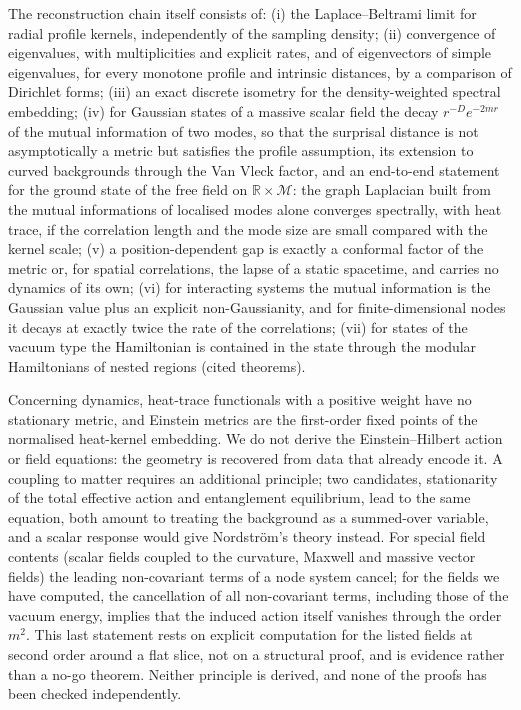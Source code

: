 \documentclass[11pt,a4paper]{article}
\theoremstyle{stmt}
\theoremstyle{defn}
\theoremstyle{rmk}
\numberwithin{equation}{section}
\newcommand{\M}{\mathcal{M}}
\newcommand{\R}{\mathbb{R}}
\begin{document}
{\smallskip\noindent The reconstruction chain itself consists of: (i) the Laplace--Beltrami limit for radial profile kernels, independently of the sampling density; (ii) convergence of eigenvalues, with multiplicities and explicit rates, and of eigenvectors of simple eigenvalues, for every monotone profile and intrinsic distances, by a comparison of Dirichlet forms; (iii) an exact discrete isometry for the density-weighted spectral embedding; (iv) for Gaussian states of a massive scalar field the decay $r^{-D}e^{-2mr}$ of the mutual information of two modes, so that the surprisal distance is not asymptotically a metric but satisfies the profile assumption, its extension to curved backgrounds through the Van Vleck factor, and an end-to-end statement for the ground state of the free field on $\R\times\M$: the graph Laplacian built from the mutual informations of localised modes alone converges spectrally, with heat trace, if the correlation length and the mode size are small compared with the kernel scale; (v) a position-dependent gap is exactly a conformal factor of the metric or, for spatial correlations, the lapse of a static spacetime, and carries no dynamics of its own; (vi) for interacting systems the mutual information is the Gaussian value plus an explicit non-Gaussianity, and for finite-dimensional nodes it decays at exactly twice the rate of the correlations; (vii) for states of the vacuum type the Hamiltonian is contained in the state through the modular Hamiltonians of nested regions (cited theorems).

\smallskip\noindent Concerning dynamics, heat-trace functionals with a positive weight have no stationary metric, and Einstein metrics are the first-order fixed points of the normalised heat-kernel embedding. We do not derive the Einstein--Hilbert action or field equations: the geometry is recovered from data that already encode it. A coupling to matter requires an additional principle; two candidates, stationarity of the total effective action and entanglement equilibrium, lead to the same equation, both amount to treating the background as a summed-over variable, and a scalar response would give Nordstr\"om's theory instead. For special field contents (scalar fields coupled to the curvature, Maxwell and massive vector fields) the leading non-covariant terms of a node system cancel; for the fields we have computed, the cancellation of all non-covariant terms, including those of the vacuum energy, implies that the induced action itself vanishes through the order $m^2$. This last statement rests on explicit computation for the listed fields at second order around a flat slice, not on a structural proof, and is evidence rather than a no-go theorem. Neither principle is derived, and none of the proofs has been checked independently.\par}
\end{document}
